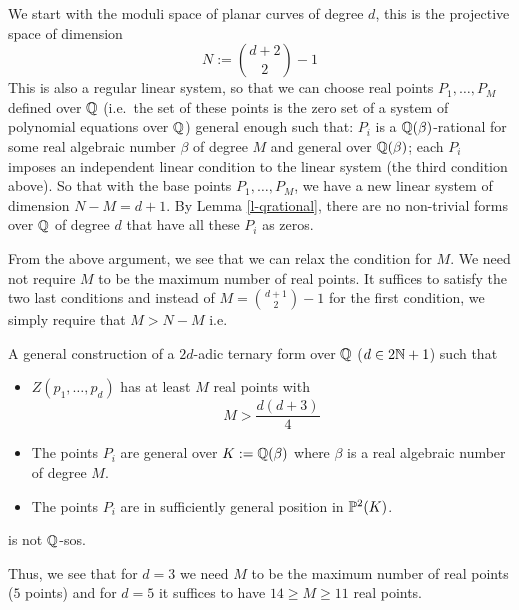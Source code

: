 \begin{none}
We start with the moduli space of planar curves of degree $d$, this is the projective space of dimension
$$N := \binom{d+2}2 -1 $$
This is also a regular linear system, so that we can choose real points $P_1,\dots, P_M$ defined over $\Q$ (i.e.\ the
set of these points is the zero set of a system of polynomial equations over $\Q$) general enough such that:
$P_i$ is a $\Q(\beta)$-rational for some real algebraic number $\beta$ of degree $M$ and general over $\Q(\beta)$;
each $P_i$ imposes an independent linear condition to the linear system (the third condition above). So that with the
base points $P_1,\dots, P_M$, we have a
new linear system of dimension $N-M=d+1$. By Lemma \ref{l-qrational}, there are
no non-trivial forms over $\Q$ of degree $d$ that have all these $P_i$ as zeros.
\end{none}

From the above argument, we see that we can relax the condition for $M$. We need not require $M$ to be the
maximum number of real points. It suffices to satisfy the two last
conditions and instead of $M=\binom{d+1}2-1$ for the first condition, we simply require that $M > N-M$ i.e.
\begin{prop}
A general construction of a $2d$-adic ternary form over $\Q$ ($d\in 2\N+1$) such that
\begin{itemize}
\item $Z(p_1,\dots, p_d)$ has at least $M$ real points with
$$ M > \frac{d(d+3)}4$$
\item The points $P_i$ are general over $K:=\Q(\beta)$ where $\beta$ is a real algebraic number of degree $M$.
\item The points $P_i$ are in sufficiently general position in $\P^2(K)$.
\end{itemize}
is not $\Q$-sos.
\end{prop}

\noindent
Thus, we see that for $d=3$ we need $M$ to be the maximum number of real points ($5$ points) and for $d=5$ it
suffices to have $14\ge M \ge 11$ real points. %
